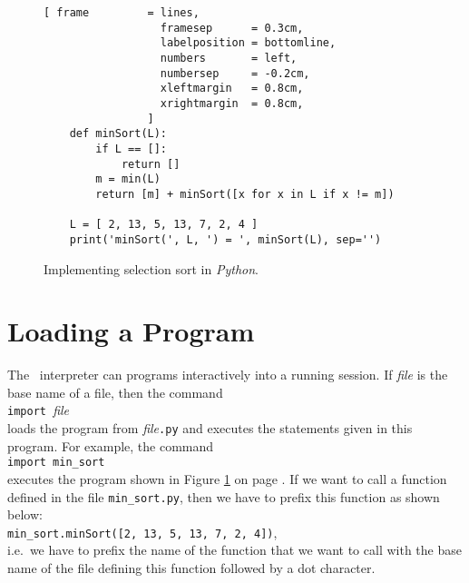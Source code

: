 \begin{figure}[!ht]
\centering
\begin{Verbatim}[ frame         = lines, 
                  framesep      = 0.3cm, 
                  labelposition = bottomline,
                  numbers       = left,
                  numbersep     = -0.2cm,
                  xleftmargin   = 0.8cm,
                  xrightmargin  = 0.8cm,
                ]
    def minSort(L):
        if L == []:
            return []
        m = min(L)
        return [m] + minSort([x for x in L if x != m])
    
    L = [ 2, 13, 5, 13, 7, 2, 4 ]
    print('minSort(', L, ') = ', minSort(L), sep='')
\end{Verbatim}
\vspace*{-0.3cm}
\caption{Implementing selection sort in \textsl{Python}.}
\label{fig:min-sort.py}
\end{figure}


\section{Loading a Program}
The \setlx\ interpreter can  programs interactively into a running session.
If \textsl{file} is the base name of a file, then the command
\\[0.2cm]
\hspace*{1.3cm}
\texttt{import }\textsl{file}
\\[0.2cm]
loads the program from  \textsl{file}\texttt{.py} and executes the statements given in this program.
For example, the command
\\[0.2cm]
\hspace*{1.3cm}
\texttt{import min\_sort}
\\[0.2cm]
executes the program shown in Figure
\ref{fig:min-sort.py} on page \pageref{fig:min-sort.py}.  If we want to call a function defined in the file
\texttt{min\_sort.py},  then we have to prefix this function as shown below:
\\[0.2cm]
\hspace*{1.3cm}
\texttt{min\_sort.minSort([2, 13, 5, 13, 7, 2, 4])},
\\[0.2cm]
i.e.~we have to prefix the name of the function that we want to call with the base name of the file defining
this function followed by a dot character.

